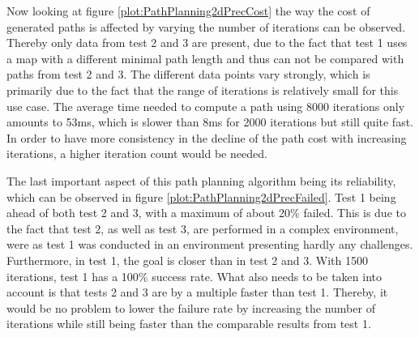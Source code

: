 

Now looking at figure \ref{plot:PathPlanning2dPrecCost} the way the cost of generated paths is affected by varying the number of iterations can be observed. Thereby only data from test 2 and 3 are present, due to the fact that test 1 uses a map with a different minimal path length and thus can not be compared with paths from test 2 and 3. The different data points vary strongly, which is primarily due to the fact that the range of iterations is relatively small for this use case. The average time needed to compute a path using 8000 iterations only amounts to 53ms, which is slower than 8ms for 2000 iterations but still quite fast. In order to have more consistency in the decline of the path cost with increasing iterations, a higher iteration count would be needed.



The last important aspect of this path planning algorithm being its reliability, which can be observed in figure \ref{plot:PathPlanning2dPrecFailed}. Test 1 being ahead of both test 2 and 3, with a maximum of about 20\% failed. This is due to the fact that test 2, as well as test 3, are performed in a complex environment, were as test 1 was conducted in an environment presenting hardly any challenges. Furthermore, in test 1, the goal is closer than in test 2 and 3. With 1500 iterations, test 1 has a 100\% success rate. What also needs to be taken into account is that tests 2 and 3 are by a multiple faster than test 1. Thereby, it would be no problem to lower the failure rate by increasing the number of iterations while still being faster than the comparable results from test 1.



